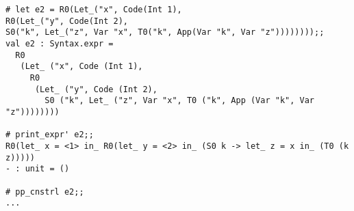 \begin{lstlisting}
# let e2 = R0(Let_("x", Code(Int 1),
R0(Let_("y", Code(Int 2),
S0("k", Let_("z", Var "x", T0("k", App(Var "k", Var "z"))))))));;
val e2 : Syntax.expr =
  R0
   (Let_ ("x", Code (Int 1),
     R0
      (Let_ ("y", Code (Int 2),
        S0 ("k", Let_ ("z", Var "x", T0 ("k", App (Var "k", Var "z"))))))))

# print_expr' e2;;
R0(let_ x = <1> in_ R0(let_ y = <2> in_ (S0 k -> let_ z = x in_ (T0 (k z)))))
- : unit = ()

# pp_cnstrl e2;;
...
\end{lstlisting}


